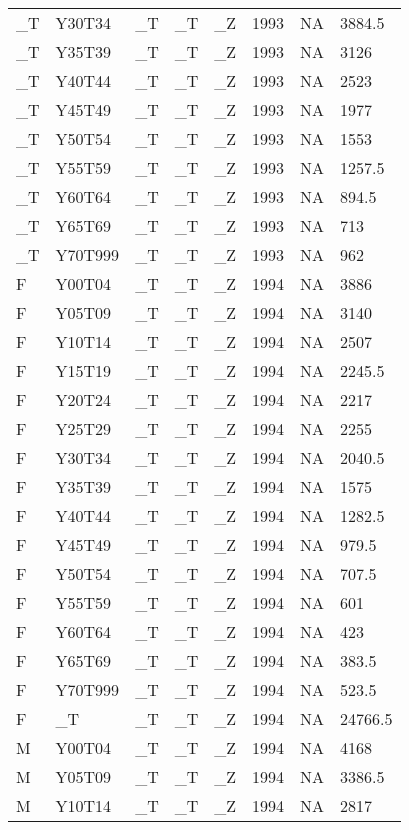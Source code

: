 \begin{longtable}[t]{llllllll}
\_T & Y30T34 & \_T & \_T & \_Z & 1993 & NA & 3884.5\\
\_T & Y35T39 & \_T & \_T & \_Z & 1993 & NA & 3126\\
\_T & Y40T44 & \_T & \_T & \_Z & 1993 & NA & 2523\\
\addlinespace
\_T & Y45T49 & \_T & \_T & \_Z & 1993 & NA & 1977\\
\_T & Y50T54 & \_T & \_T & \_Z & 1993 & NA & 1553\\
\_T & Y55T59 & \_T & \_T & \_Z & 1993 & NA & 1257.5\\
\_T & Y60T64 & \_T & \_T & \_Z & 1993 & NA & 894.5\\
\_T & Y65T69 & \_T & \_T & \_Z & 1993 & NA & 713\\
\addlinespace
\_T & Y70T999 & \_T & \_T & \_Z & 1993 & NA & 962\\
F & Y00T04 & \_T & \_T & \_Z & 1994 & NA & 3886\\
F & Y05T09 & \_T & \_T & \_Z & 1994 & NA & 3140\\
F & Y10T14 & \_T & \_T & \_Z & 1994 & NA & 2507\\
F & Y15T19 & \_T & \_T & \_Z & 1994 & NA & 2245.5\\
\addlinespace
F & Y20T24 & \_T & \_T & \_Z & 1994 & NA & 2217\\
F & Y25T29 & \_T & \_T & \_Z & 1994 & NA & 2255\\
F & Y30T34 & \_T & \_T & \_Z & 1994 & NA & 2040.5\\
F & Y35T39 & \_T & \_T & \_Z & 1994 & NA & 1575\\
F & Y40T44 & \_T & \_T & \_Z & 1994 & NA & 1282.5\\
\addlinespace
F & Y45T49 & \_T & \_T & \_Z & 1994 & NA & 979.5\\
F & Y50T54 & \_T & \_T & \_Z & 1994 & NA & 707.5\\
F & Y55T59 & \_T & \_T & \_Z & 1994 & NA & 601\\
F & Y60T64 & \_T & \_T & \_Z & 1994 & NA & 423\\
F & Y65T69 & \_T & \_T & \_Z & 1994 & NA & 383.5\\
\addlinespace
F & Y70T999 & \_T & \_T & \_Z & 1994 & NA & 523.5\\
F & \_T & \_T & \_T & \_Z & 1994 & NA & 24766.5\\
M & Y00T04 & \_T & \_T & \_Z & 1994 & NA & 4168\\
M & Y05T09 & \_T & \_T & \_Z & 1994 & NA & 3386.5\\
M & Y10T14 & \_T & \_T & \_Z & 1994 & NA & 2817\\

\end{longtable}
